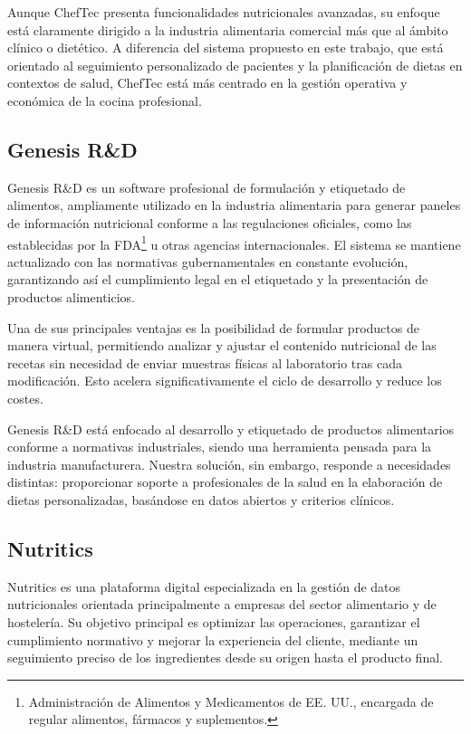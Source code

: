 Aunque ChefTec presenta funcionalidades nutricionales avanzadas, su enfoque está claramente dirigido a la industria alimentaria comercial más que al ámbito clínico o dietético. A diferencia del sistema propuesto en este trabajo, que está orientado al seguimiento personalizado de pacientes y la planificación de dietas en contextos de salud, ChefTec está más centrado en la gestión operativa y económica de la cocina profesional.

\subsection{Genesis R\&D\cite{GenesisRD}}
Genesis R\&D es un software profesional de formulación y etiquetado de alimentos, ampliamente utilizado en la industria alimentaria para generar paneles de información nutricional conforme a las regulaciones oficiales, como las establecidas por la FDA\footnote{Administración de Alimentos y Medicamentos de EE. UU., encargada de regular alimentos, fármacos y suplementos.} u otras agencias internacionales. El sistema se mantiene actualizado con las normativas gubernamentales en constante evolución, garantizando así el cumplimiento legal en el etiquetado y la presentación de productos alimenticios.

Una de sus principales ventajas es la posibilidad de formular productos de manera virtual, permitiendo analizar y ajustar el contenido nutricional de las recetas sin necesidad de enviar muestras físicas al laboratorio tras cada modificación. Esto acelera significativamente el ciclo de desarrollo y reduce los costes.

Genesis R\&D está enfocado al desarrollo y etiquetado de productos alimentarios conforme a normativas industriales, siendo una herramienta pensada para la industria manufacturera. Nuestra solución, sin embargo, responde a necesidades distintas: proporcionar soporte a profesionales de la salud en la elaboración de dietas personalizadas, basándose en datos abiertos y criterios clínicos.

\subsection{Nutritics\cite{Nutritics}}
Nutritics es una plataforma digital especializada en la gestión de datos nutricionales orientada principalmente a empresas del sector alimentario y de hostelería. Su objetivo principal es optimizar las operaciones, garantizar el cumplimiento normativo y mejorar la experiencia del cliente, mediante un seguimiento preciso de los ingredientes desde su origen hasta el producto final.

